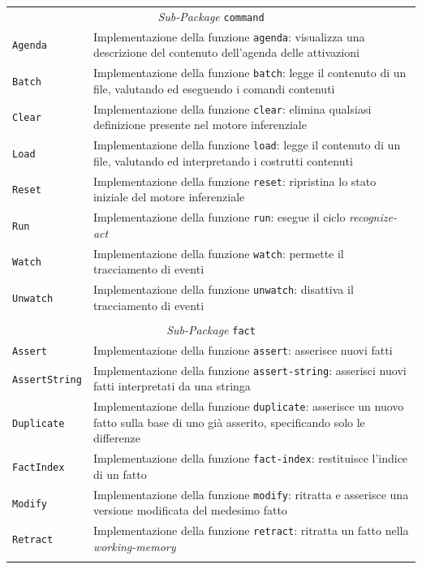 \begin{longtable}{p{3.5cm}p{8.5cm}}
\multicolumn{2}{c}{\emph{Sub-Package} \texttt{command}}\\
	\hdashline[1pt/5pt]
		\texttt{Agenda} & Implementazione della funzione \texttt{agenda}: visualizza una descrizione del contenuto dell'agenda delle attivazioni \\ 
	\hdashline[1pt/5pt]
		\texttt{Batch} & Implementazione della funzione \texttt{batch}: legge il contenuto di un file, valutando ed eseguendo i comandi contenuti\\ 
	\hdashline[1pt/5pt]
		\texttt{Clear} & Implementazione della funzione \texttt{clear}: elimina qualsiasi definizione presente nel motore inferenziale\\ 
	\hdashline[1pt/5pt]
		\texttt{Load} & Implementazione della funzione \texttt{load}: legge il contenuto di un file, valutando ed interpretando i costrutti contenuti\\ 
	\hdashline[1pt/5pt]
		\texttt{Reset} & Implementazione della funzione \texttt{reset}: ripristina lo stato iniziale del motore inferenziale \\ 
	\hdashline[1pt/5pt]
		\texttt{Run} & Implementazione della funzione \texttt{run}: esegue il ciclo \emph{recognize-act}\\ 
	\hdashline[1pt/5pt]
		\texttt{Watch} & Implementazione della funzione \texttt{watch}: permette il tracciamento di eventi\\
	\hdashline[1pt/5pt]
		\texttt{Unwatch} & Implementazione della funzione \texttt{unwatch}: disattiva il tracciamento di eventi\\
	\hline\\	

\multicolumn{2}{c}{\emph{Sub-Package} \texttt{fact}}\\
	\hdashline[5pt/5pt]
		\texttt{Assert} & Implementazione della funzione \texttt{assert}: asserisce nuovi fatti \\ 
	\hdashline[1pt/5pt]
		\texttt{AssertString} & Implementazione della funzione \texttt{assert-string}: asserisci nuovi fatti interpretati da una stringa\\ 
	\hdashline[1pt/5pt]
		\texttt{Duplicate} & Implementazione della funzione \texttt{duplicate}: asserisce un nuovo fatto sulla base di uno già asserito, specificando solo le differenze\\ 
	\hdashline[1pt/5pt]
		\texttt{FactIndex} & Implementazione della funzione \texttt{fact-index}: restituisce l'indice di un fatto\\ 
	\hdashline[1pt/5pt]
		\texttt{Modify} & Implementazione della funzione \texttt{modify}: ritratta e asserisce una versione modificata del medesimo fatto\\ 
	\hdashline[1pt/5pt]
		\texttt{Retract} & Implementazione della funzione \texttt{retract}: ritratta un fatto nella \emph{working-memory}\\ 
	\hline\\
	

\end{longtable}

